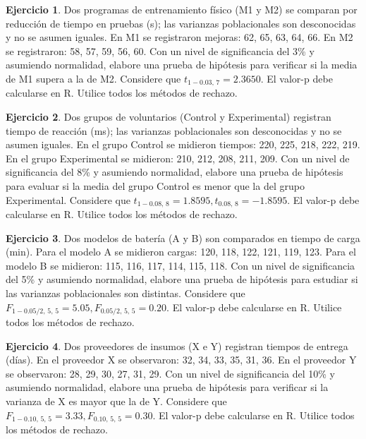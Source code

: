 \documentclass[
  11pt,
]{book}
\theoremstyle{definition}
\theoremstyle{definition}
\theoremstyle{definition}
\newtheorem{exercise}{Ejercicio}[chapter]
\theoremstyle{definition}
\theoremstyle{remark}
\begin{document}
\begin{exercise}
Dos programas de entrenamiento físico (M1 y M2) se comparan por reducción de tiempo en pruebas (s); las varianzas poblacionales son desconocidas y no se asumen iguales. En M1 se registraron mejoras: 62, 65, 63, 64, 66. En M2 se registraron: 58, 57, 59, 56, 60. Con un nivel de significancia del 3\% y asumiendo normalidad, elabore una prueba de hipótesis para verificar si la media de M1 supera a la de M2. Considere que \(t_{1-0.03,\,7}=2.3650\). El valor-p debe calcularse en R. Utilice todos los métodos de rechazo.
\end{exercise}

\begin{exercise}
Dos grupos de voluntarios (Control y Experimental) registran tiempo de reacción (ms); las varianzas poblacionales son desconocidas y no se asumen iguales. En el grupo Control se midieron tiempos: 220, 225, 218, 222, 219. En el grupo Experimental se midieron: 210, 212, 208, 211, 209. Con un nivel de significancia del 8\% y asumiendo normalidad, elabore una prueba de hipótesis para evaluar si la media del grupo Control es menor que la del grupo Experimental. Considere que \(t_{1-0.08,\,8}=1.8595, t_{0.08,\,8}=-1.8595\). El valor-p debe calcularse en R. Utilice todos los métodos de rechazo.
\end{exercise}

\begin{exercise}
Dos modelos de batería (A y B) son comparados en tiempo de carga (min). Para el modelo A se midieron cargas: 120, 118, 122, 121, 119, 123. Para el modelo B se midieron: 115, 116, 117, 114, 115, 118. Con un nivel de significancia del 5\% y asumiendo normalidad, elabore una prueba de hipótesis para estudiar si las varianzas poblacionales son distintas. Considere que \(F_{1-0.05/2,\,5,\,5}=5.05, F_{0.05/2,\,5,\,5}=0.20\). El valor-p debe calcularse en R. Utilice todos los métodos de rechazo.
\end{exercise}

\begin{exercise}
Dos proveedores de insumos (X e Y) registran tiempos de entrega (días). En el proveedor X se observaron: 32, 34, 33, 35, 31, 36. En el proveedor Y se observaron: 28, 29, 30, 27, 31, 29. Con un nivel de significancia del 10\% y asumiendo normalidad, elabore una prueba de hipótesis para verificar si la varianza de X es mayor que la de Y. Considere que \(F_{1-0.10,\,5,\,5}=3.33, F_{0.10,\,5,\,5}=0.30\). El valor-p debe calcularse en R. Utilice todos los métodos de rechazo.
\end{exercise}
\end{document}
